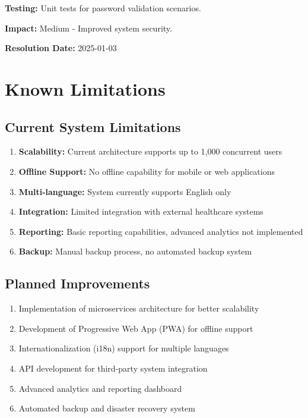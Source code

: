 \documentclass[12pt,a4paper]{article}
\begin{document}
\textbf{Testing:} Unit tests for password validation scenarios.

\textbf{Impact:} Medium - Improved system security.

\textbf{Resolution Date:} 2025-01-03

\section{Known Limitations}

\subsection{Current System Limitations}

\begin{enumerate}
    \item \textbf{Scalability:} Current architecture supports up to 1,000 concurrent users
    \item \textbf{Offline Support:} No offline capability for mobile or web applications
    \item \textbf{Multi-language:} System currently supports English only
    \item \textbf{Integration:} Limited integration with external healthcare systems
    \item \textbf{Reporting:} Basic reporting capabilities, advanced analytics not implemented
    \item \textbf{Backup:} Manual backup process, no automated backup system
\end{enumerate}

\subsection{Planned Improvements}

\begin{enumerate}
    \item Implementation of microservices architecture for better scalability
    \item Development of Progressive Web App (PWA) for offline support
    \item Internationalization (i18n) support for multiple languages
    \item API development for third-party system integration
    \item Advanced analytics and reporting dashboard
    \item Automated backup and disaster recovery system
\end{enumerate}
\end{document}
